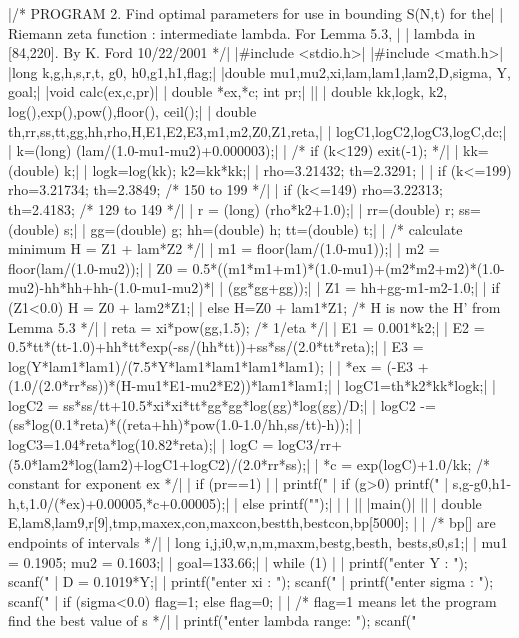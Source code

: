{\beginlines
|/* PROGRAM 2.  Find optimal parameters for use in bounding S(N,t) for the|
|   Riemann zeta function  : intermediate lambda.  For Lemma 5.3,  |
|   lambda in [84,220].  By K. Ford 10/22/2001        */|
|#include <stdio.h>|
|#include <math.h>|
|long k,g,h,s,r,t, g0, h0,g1,h1,flag;|
|double mu1,mu2,xi,lam,lam1,lam2,D,sigma, Y, goal;|
|void calc(ex,c,pr)|
|     double *ex,*c; int pr;|
|{|
|  double kk,logk, k2, log(),exp(),pow(),floor(), ceil();|
|  double th,rr,ss,tt,gg,hh,rho,H,E1,E2,E3,m1,m2,Z0,Z1,reta,|
|     logC1,logC2,logC3,logC,dc;|
|  k=(long) (lam/(1.0-mu1-mu2)+0.000003);|
|  /* if (k<129) exit(-1); */|
|  kk=(double) k;|
|  logk=log(kk); k2=kk*kk;|
|  rho=3.21432; th=2.3291; | 
|  if (k<=199)  { rho=3.21734; th=2.3849; }    /* 150 to 199 */|
|  if (k<=149)  { rho=3.22313; th=2.4183; }    /* 129 to 149 */|
|  r = (long) (rho*k2+1.0);|
|  rr=(double) r;  ss=(double) s;|
|  gg=(double) g;  hh=(double) h; tt=(double) t;|
|    /* calculate minimum H = Z1 + lam*Z2 */|
|  m1 = floor(lam/(1.0-mu1));|
|  m2 = floor(lam/(1.0-mu2));|
|  Z0 = 0.5*((m1*m1+m1)*(1.0-mu1)+(m2*m2+m2)*(1.0-mu2)-hh*hh+hh-(1.0-mu1-mu2)*|
|	    (gg*gg+gg));|
|  Z1 = hh+gg-m1-m2-1.0;|
|  if (Z1<0.0) H = Z0 + lam2*Z1;|
|  else H=Z0 + lam1*Z1;   /* H is now the H' from Lemma 5.3 */|
|  reta = xi*pow(gg,1.5);   /* 1/eta */|
|  E1 = 0.001*k2;|
|  E2 = 0.5*tt*(tt-1.0)+hh*tt*exp(-ss/(hh*tt))+ss*ss/(2.0*tt*reta);|
|  E3 = log(Y*lam1*lam1)/(7.5*Y*lam1*lam1*lam1*lam1); |
|  *ex = (-E3 + (1.0/(2.0*rr*ss))*(H-mu1*E1-mu2*E2))*lam1*lam1;|
|  logC1=th*k2*kk*logk;|
|  logC2 = ss*ss/tt+10.5*xi*xi*tt*gg*gg*log(gg)*log(gg)/D;|
|  logC2 -= (ss*log(0.1*reta)*((reta+hh)*pow(1.0-1.0/hh,ss/tt)-h));|
|  logC3=1.04*reta*log(10.82*reta);|
|  logC = logC3/rr+(5.0*lam2*log(lam2)+logC1+logC2)/(2.0*rr*ss);|
|  *c = exp(logC)+1.0/kk;  /* constant for exponent ex */|
|  if (pr==1) {|
|    printf("%
|    if (g>0) printf(" %
|		    s,g-g0,h1-h,t,1.0/(*ex)+0.00005,*c+0.00005);|
|    else printf("\n");|
|  }|
|}|
|main()|
|{|
|  double E,lam8,lam9,r[9],tmp,maxex,con,maxcon,bestth,bestcon,bp[5000]; |
|     /* bp[] are endpoints of intervals */|
|  long i,j,i0,w,n,m,maxm,bestg,besth, bests,s0,s1;|
|  mu1 = 0.1905; mu2 = 0.1603;|
|  goal=133.66;|
|  while (1) {  |
|    printf("enter Y  : "); scanf("%
|    D = 0.1019*Y;|
|    printf("enter xi : "); scanf("%
|    printf("enter sigma : "); scanf("%
|    if (sigma<0.0) flag=1; else flag=0;  |
|    /* flag=1 means let the program find the best value of s */|
|    printf("enter lambda range: "); scanf("%
}}}
